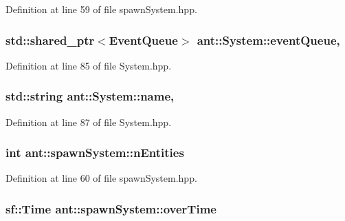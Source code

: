 Definition at line 59 of file spawn\+System.\+hpp.

\hypertarget{classant_1_1_system_a27e1814e13d161b5ef0e848e3da16d29}{
\subsubsection[{event\+Queue}]{\setlength{\rightskip}{0pt plus 5cm}std\+::shared\+\_\+ptr$<${\bf Event\+Queue}$>$ ant\+::\+System\+::event\+Queue\hspace{0.3cm}{\ttfamily [protected]}, {\ttfamily [inherited]}}}\label{classant_1_1_system_a27e1814e13d161b5ef0e848e3da16d29}


Definition at line 85 of file System.\+hpp.

\hypertarget{classant_1_1_system_a60b3c00a760a3b4947ab1f1fc534a5b2}{
\subsubsection[{name}]{\setlength{\rightskip}{0pt plus 5cm}std\+::string ant\+::\+System\+::name\hspace{0.3cm}{\ttfamily [protected]}, {\ttfamily [inherited]}}}\label{classant_1_1_system_a60b3c00a760a3b4947ab1f1fc534a5b2}


Definition at line 87 of file System.\+hpp.

\hypertarget{classant_1_1spawn_system_ac15adf011d5664cfcecad025ece96c09}{
\subsubsection[{n\+Entities}]{\setlength{\rightskip}{0pt plus 5cm}int ant\+::spawn\+System\+::n\+Entities\hspace{0.3cm}{\ttfamily [private]}}}\label{classant_1_1spawn_system_ac15adf011d5664cfcecad025ece96c09}


Definition at line 60 of file spawn\+System.\+hpp.

\hypertarget{classant_1_1spawn_system_a5d716493bd70cb52490152d7075a490e}{
\subsubsection[{over\+Time}]{\setlength{\rightskip}{0pt plus 5cm}sf\+::\+Time ant\+::spawn\+System\+::over\+Time\hspace{0.3cm}{\ttfamily [private]}}}\label{classant_1_1spawn_system_a5d716493bd70cb52490152d7075a490e}


